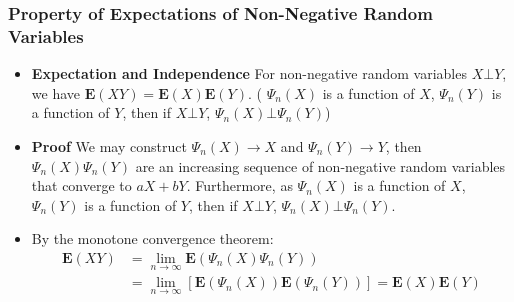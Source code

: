 \documentclass[handout]{beamer}
\newcommand{\BE}{\mathbf{E}}
\begin{document}
\frame
{
  \frametitle{Property of Expectations of Non-Negative Random Variables }

   \begin{itemize}



                         
                                                  \item<1->  \textbf{Expectation and Independence} For non-negative random variables $X\bot Y$, we have $\BE(XY)=\BE(X) \BE(Y)$. ( $\Psi_n(X)$ is a function of $X$, $\Psi_n(Y)$ is a function of $Y$, then if $X\bot Y$, $\Psi_n(X)\bot \Psi_n(Y)$) 
                                                  
                                                  
                                                                           \item<2->\textbf{Proof} We may construct $\Psi_n(X)\rightarrow X$ and $\Psi_n(Y)\rightarrow Y$, then $\Psi_n(X)\Psi_n(Y)$ are an increasing sequence of non-negative random variables that converge to $aX+bY$.  Furthermore, as $\Psi_n(X)$ is a function of $X$, $\Psi_n(Y)$ is a function of $Y$, then if $X\bot Y$, $\Psi_n(X)\bot \Psi_n(Y)$.
                                                                           
                                                                           
                                                                   \item<3->[-]          By the monotone convergence theorem:
                                                         \begin{align*}\BE(XY)& =\lim_{n\rightarrow \infty} \BE (\Psi_n(X)\Psi_n(Y)) \\ & =\lim_{n\rightarrow \infty}[ \BE(\Psi_n(X)) \BE(\Psi_n(Y)) ]=\BE(X)\BE(Y)\end{align*}


                                                  
                              
                                                  
                                 \end{itemize}
}
\end{document}
